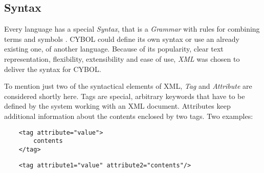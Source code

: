 %
%
%
%
%
%
%

\subsection{Syntax}
\label{syntax_heading}

Every language has a special \emph{Syntax}, that is a \emph{Grammar} with rules
for combining terms and symbols \cite{foldoc}. CYBOL could define its own
syntax or use an already existing one, of another language. Because of its
popularity, clear text representation, flexibility, extensibility and ease of
use, \emph{XML} was chosen to deliver the syntax for CYBOL.

To mention just two of the syntactical elements of XML, \emph{Tag} and
\emph{Attribute} are considered shortly here. Tags are special, arbitrary
keywords that have to be defined by the system working with an XML document.
Attributes keep additional information about the contents enclosed by two tags.
Two examples:

\begin{scriptsize}
    \begin{verbatim}
    <tag attribute="value">
        contents
    </tag>
    \end{verbatim}
\end{scriptsize}

\begin{scriptsize}
    \begin{verbatim}
    <tag attribute1="value" attribute2="contents"/>
    \end{verbatim}
\end{scriptsize}

